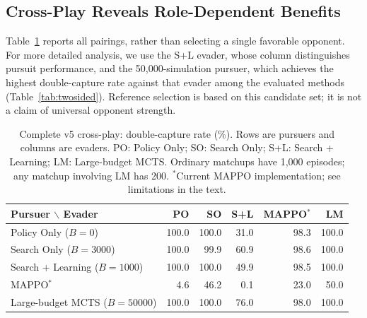 \documentclass[letterpaper,10pt,conference]{ieeeconf}
\begin{document}
\subsection{Cross-Play Reveals Role-Dependent Benefits}

Table~\ref{tab:matrix} reports all pairings, rather than selecting a
single favorable opponent. For more detailed analysis, we use the S+L
evader, whose column distinguishes pursuit performance, and the
50,000-simulation pursuer, which achieves the highest double-capture
rate against that evader among the evaluated methods
(Table~\ref{tab:twosided}). Reference selection is based on this candidate
set; it is not a claim of universal opponent strength.

\begin{table}[t]
\centering\footnotesize
\caption{Complete v5 cross-play: double-capture rate (\%). Rows are
pursuers and columns are evaders. PO: Policy Only; SO: Search Only;
S+L: Search + Learning; LM: Large-budget MCTS. Ordinary matchups have
1,000 episodes; any matchup involving LM has 200. $^*$Current MAPPO
implementation; see limitations in the text.}
\label{tab:matrix}
\begin{tabular*}{\textwidth}{@{\extracolsep{\fill}}lrrrrr@{}}\toprule
Pursuer $\backslash$ Evader & PO & SO & S+L & MAPPO$^*$ & LM \\ \midrule
Policy Only ($B=0$) & 100.0 & 100.0 & 31.0 & 98.3 & 100.0 \\
Search Only ($B=3000$) & 100.0 & 99.9 & 60.9 & 98.6 & 100.0 \\
Search + Learning ($B=1000$) & 100.0 & 100.0 & 49.9 & 98.5 & 100.0 \\
MAPPO$^*$ & 4.6 & 46.2 & 0.1 & 23.0 & 50.0 \\
Large-budget MCTS ($B=50000$) & 100.0 & 100.0 & 76.0 & 98.0 & 100.0 \\
\bottomrule\end{tabular*}
\end{table}
\end{document}
